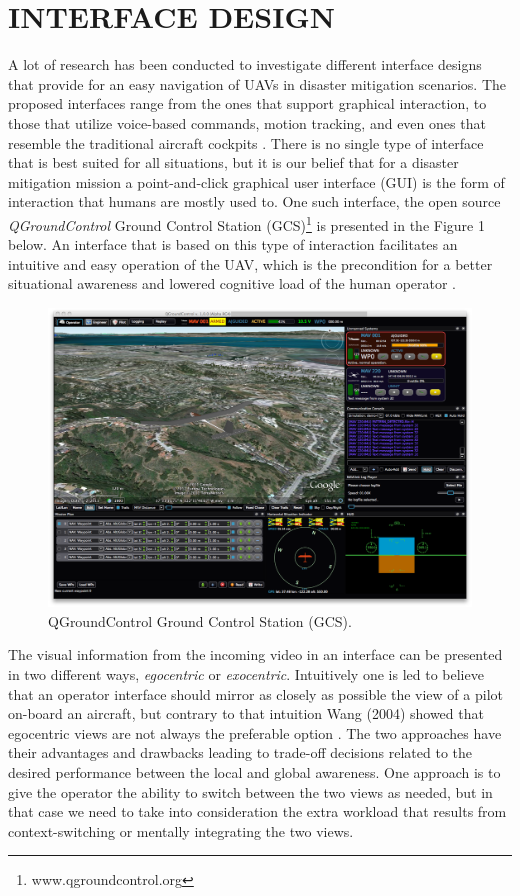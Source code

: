 \documentclass[12pt, letterpaper, oneside]{article}
\begin{document}
\section{INTERFACE DESIGN}
A lot of research has been conducted to investigate different interface designs that provide for an easy navigation of UAVs in disaster mitigation scenarios. The proposed interfaces range from the ones that support graphical interaction, to those that utilize voice-based commands, motion tracking, and even ones that resemble the traditional aircraft cockpits \cite{8, 23, 24, 25}. There is no single type of interface that is best suited for all situations, but it is our belief that for a disaster mitigation mission a point-and-click graphical user interface (GUI) is the form of interaction that humans are mostly used to. One such interface, the open source \emph{QGroundControl} Ground Control Station (GCS)\footnote{www.qgroundcontrol.org} is presented in the Figure 1 below. An interface that is based on this type of interaction facilitates an intuitive and easy operation of the UAV, which is the precondition for a better situational awareness and lowered cognitive load of the human operator \cite{32}. 

\begin{figure}[h!]
  \caption{QGroundControl Ground Control Station (GCS).}
  \centering
    \includegraphics[width=1.0\textwidth]{QGC}
\end{figure}

The visual information from the incoming video in an interface can be presented in two different ways, \emph{egocentric} or \emph{exocentric}. Intuitively one is led to believe that an operator interface should mirror as closely as possible the view of a pilot on-board an aircraft, but contrary to that intuition Wang (2004) showed that egocentric views are not always the preferable option \cite{31}. The two approaches have their advantages and drawbacks leading to trade-off decisions related to the desired performance between the local and global awareness. One approach is to give the operator the ability to switch between the two views as needed, but in that case we need to take into consideration the extra workload that results from context-switching or mentally integrating the two views. 
\end{document}
